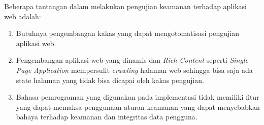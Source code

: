 Beberapa tantangan dalam melakukan pengujian keamanan terhadap aplikasi web adalah:
\begin{enumerate}
    \item Butuhnya pengembangan kakas yang dapat mengotomatisasi pengujian aplikasi web.
    
    \item Pengembangan aplikasi web yang dinamis dan \textit{Rich Content} seperti \textit{Single-Page Application}
    mempersulit \textit{crawling} halaman web sehingga bisa saja ada state halaman yang
    tidak bisa dicapai oleh kakas pengujian.

    \item Bahasa pemrograman yang digunakan pada implementasi tidak memiliki fitur yang
    dapat memaksa penggunaan aturan keamanan yang dapat menyebabkan bahaya terhadap keamanan
    dan integritas data pengguna.
\end{enumerate}